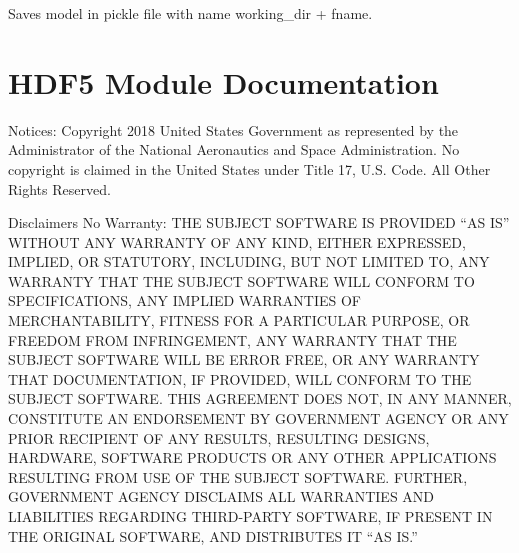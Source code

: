 \documentclass[letterpaper,10pt,english]{sphinxmanual}
\begin{document}
\begin{fulllineitems}
\begin{fulllineitems}
\end{fulllineitems}


\begin{fulllineitems}
\label{\detokenize{source_code:smcpy.mcmc.mcmc_sampler.MCMCSampler.save_model}}
Saves model in pickle file with name working\_dir + fname.

\end{fulllineitems}


\end{fulllineitems}



\section{HDF5 Module Documentation}
\label{\detokenize{source_code:module-smcpy.hdf5.hdf5_storage}}\label{\detokenize{source_code:hdf5-module-documentation}}
Notices:
Copyright 2018 United States Government as represented by the Administrator of
the National Aeronautics and Space Administration. No copyright is claimed in
the United States under Title 17, U.S. Code. All Other Rights Reserved.

Disclaimers
No Warranty: THE SUBJECT SOFTWARE IS PROVIDED “AS IS” WITHOUT ANY WARRANTY OF
ANY KIND, EITHER EXPRESSED, IMPLIED, OR STATUTORY, INCLUDING, BUT NOT LIMITED
TO, ANY WARRANTY THAT THE SUBJECT SOFTWARE WILL CONFORM TO SPECIFICATIONS, ANY
IMPLIED WARRANTIES OF MERCHANTABILITY, FITNESS FOR A PARTICULAR PURPOSE, OR
FREEDOM FROM INFRINGEMENT, ANY WARRANTY THAT THE SUBJECT SOFTWARE WILL BE ERROR
FREE, OR ANY WARRANTY THAT DOCUMENTATION, IF PROVIDED, WILL CONFORM TO THE
SUBJECT SOFTWARE. THIS AGREEMENT DOES NOT, IN ANY MANNER, CONSTITUTE AN
ENDORSEMENT BY GOVERNMENT AGENCY OR ANY PRIOR RECIPIENT OF ANY RESULTS,
RESULTING DESIGNS, HARDWARE, SOFTWARE PRODUCTS OR ANY OTHER APPLICATIONS
RESULTING FROM USE OF THE SUBJECT SOFTWARE.  FURTHER, GOVERNMENT AGENCY
DISCLAIMS ALL WARRANTIES AND LIABILITIES REGARDING THIRD-PARTY SOFTWARE, IF
PRESENT IN THE ORIGINAL SOFTWARE, AND DISTRIBUTES IT “AS IS.”
\end{document}
